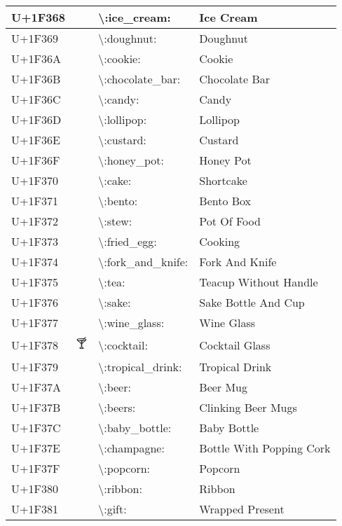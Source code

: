 \begin{table}[h]
\begin{tabulary}{\linewidth}{|L|L|L|L|}
\hline
U+1F368 & 🍨 & {\textbackslash}:ice\_cream: & Ice Cream \\
\hline
U+1F369 & 🍩 & {\textbackslash}:doughnut: & Doughnut \\
\hline
U+1F36A & 🍪 & {\textbackslash}:cookie: & Cookie \\
\hline
U+1F36B & 🍫 & {\textbackslash}:chocolate\_bar: & Chocolate Bar \\
\hline
U+1F36C & 🍬 & {\textbackslash}:candy: & Candy \\
\hline
U+1F36D & 🍭 & {\textbackslash}:lollipop: & Lollipop \\
\hline
U+1F36E & 🍮 & {\textbackslash}:custard: & Custard \\
\hline
U+1F36F & 🍯 & {\textbackslash}:honey\_pot: & Honey Pot \\
\hline
U+1F370 & 🍰 & {\textbackslash}:cake: & Shortcake \\
\hline
U+1F371 & 🍱 & {\textbackslash}:bento: & Bento Box \\
\hline
U+1F372 & 🍲 & {\textbackslash}:stew: & Pot Of Food \\
\hline
U+1F373 & 🍳 & {\textbackslash}:fried\_egg: & Cooking \\
\hline
U+1F374 & 🍴 & {\textbackslash}:fork\_and\_knife: & Fork And Knife \\
\hline
U+1F375 & 🍵 & {\textbackslash}:tea: & Teacup Without Handle \\
\hline
U+1F376 & 🍶 & {\textbackslash}:sake: & Sake Bottle And Cup \\
\hline
U+1F377 & 🍷 & {\textbackslash}:wine\_glass: & Wine Glass \\
\hline
U+1F378 & 🍸 & {\textbackslash}:cocktail: & Cocktail Glass \\
\hline
U+1F379 & 🍹 & {\textbackslash}:tropical\_drink: & Tropical Drink \\
\hline
U+1F37A & 🍺 & {\textbackslash}:beer: & Beer Mug \\
\hline
U+1F37B & 🍻 & {\textbackslash}:beers: & Clinking Beer Mugs \\
\hline
U+1F37C & 🍼 & {\textbackslash}:baby\_bottle: & Baby Bottle \\
\hline
U+1F37E & 🍾 & {\textbackslash}:champagne: & Bottle With Popping Cork \\
\hline
U+1F37F & 🍿 & {\textbackslash}:popcorn: & Popcorn \\
\hline
U+1F380 & 🎀 & {\textbackslash}:ribbon: & Ribbon \\
\hline
U+1F381 & 🎁 & {\textbackslash}:gift: & Wrapped Present \\

\end{tabulary}
\end{table}
